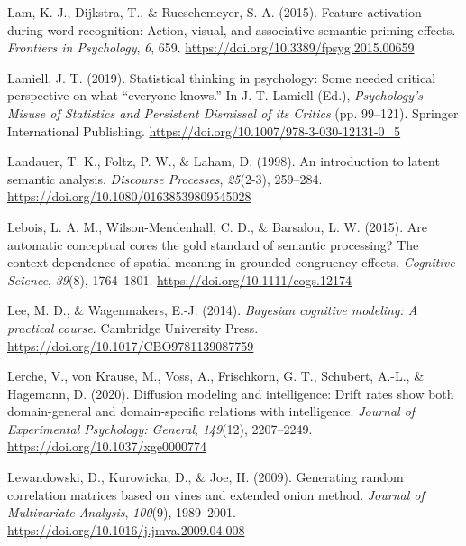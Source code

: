 \documentclass[
  12pt,
  man,floatsintext]{apa7}
\newlength{\cslhangindent}
\newlength{\cslentryspacingunit} %
\newenvironment{CSLReferences}[2] %
 {%
  \setlength{\parindent}{0pt}
  \ifodd #1
  \let\oldpar\par
  \def\par{\hangindent=\cslhangindent\oldpar}
  \fi
  \setlength{\parskip}{#2\cslentryspacingunit}
 }%
 {}
\begin{document}
\begin{CSLReferences}{1}{0}
\leavevmode{}%
Lam, K. J., Dijkstra, T., \& Rueschemeyer, S. A. (2015). Feature activation during word recognition: Action, visual, and associative-semantic priming effects. \emph{Frontiers in Psychology}, \emph{6}, 659. \url{https://doi.org/10.3389/fpsyg.2015.00659}

\leavevmode{}%
Lamiell, J. T. (2019). Statistical thinking in psychology: Some needed critical perspective on what {``everyone knows.''} In J. T. Lamiell (Ed.), \emph{Psychology's {Misuse} of {Statistics} and {Persistent Dismissal} of its {Critics}} (pp. 99--121). {Springer International Publishing}. \url{https://doi.org/10.1007/978-3-030-12131-0_5}

\leavevmode{}%
Landauer, T. K., Foltz, P. W., \& Laham, D. (1998). An introduction to latent semantic analysis. \emph{Discourse Processes}, \emph{25}(2-3), 259--284. \url{https://doi.org/10.1080/01638539809545028}

\leavevmode{}%
Lebois, L. A. M., Wilson-Mendenhall, C. D., \& Barsalou, L. W. (2015). Are automatic conceptual cores the gold standard of semantic processing? {The} context-dependence of spatial meaning in grounded congruency effects. \emph{Cognitive Science}, \emph{39}(8), 1764--1801. \url{https://doi.org/10.1111/cogs.12174}

\leavevmode{}%
Lee, M. D., \& Wagenmakers, E.-J. (2014). \emph{Bayesian cognitive modeling: {A} practical course}. {Cambridge University Press}. \url{https://doi.org/10.1017/CBO9781139087759}

\leavevmode{}%
Lerche, V., von Krause, M., Voss, A., Frischkorn, G. T., Schubert, A.-L., \& Hagemann, D. (2020). Diffusion modeling and intelligence: {Drift} rates show both domain-general and domain-specific relations with intelligence. \emph{Journal of Experimental Psychology: General}, \emph{149}(12), 2207--2249. \url{https://doi.org/10.1037/xge0000774}

\leavevmode{}%
Lewandowski, D., Kurowicka, D., \& Joe, H. (2009). Generating random correlation matrices based on vines and extended onion method. \emph{Journal of Multivariate Analysis}, \emph{100}(9), 1989--2001. \url{https://doi.org/10.1016/j.jmva.2009.04.008}


\end{CSLReferences}
\end{document}
